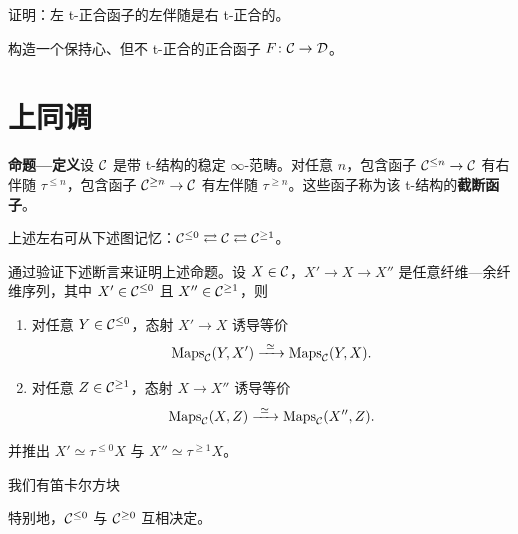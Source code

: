 \begin{exercise}\label{L16-1.12}
证明：左 t-正合函子的左伴随是右 t-正合的。
\end{exercise}

\begin{exercise}\label{L16-1.13}
构造一个保持心、但不 t-正合的正合函子 $F\colon\mathcal{C}\to\mathcal{D}$。
\end{exercise}

\section{上同调}

\nitem\label{L16-2.1}\textbf{命题—定义}\quad 设 $\mathcal{C}$ 是带 t-结构的稳定 $\infty$-范畴。对任意 $n$，包含函子 $\mathcal{C}^{\le n}\to\mathcal{C}$ 有右伴随 $\tau^{\le n}$，包含函子 $\mathcal{C}^{\ge n}\to\mathcal{C}$ 有左伴随 $\tau^{\ge n}$。这些函子称为该 t-结构的\textbf{截断函子}。

\begin{remark}\label{L16-2.2}
上述左右可从下述图记忆：$\mathcal{C}^{\le0}\rightleftarrows\mathcal{C}\rightleftarrows\mathcal{C}^{\ge1}$。
\end{remark}

\begin{exercise}\label{L16-2.3}
通过验证下述断言来证明上述命题。设 $X\in\mathcal{C}$，$X'\to X\to X''$ 是任意纤维—余纤维序列，其中 $X'\in\mathcal{C}^{\le0}$ 且 $X''\in\mathcal{C}^{\ge1}$，则
\begin{enumerate}[label=(\arabic*),leftmargin=2.4em,itemsep=0.1em]
\item 对任意 $Y\in\mathcal{C}^{\le0}$，态射 $X'\to X$ 诱导等价
\[
\operatorname{Maps}_{\cC}(Y,X')\xrightarrow{\ \simeq\ }\operatorname{Maps}_{\cC}(Y,X).
\]
\item 对任意 $Z\in\mathcal{C}^{\ge1}$，态射 $X\to X''$ 诱导等价
\[
\operatorname{Maps}_{\cC}(X,Z)\xrightarrow{\ \simeq\ }\operatorname{Maps}_{\cC}(X'',Z).
\]
\end{enumerate}
并推出 $X'\simeq\tau^{\le0}X$ 与 $X''\simeq\tau^{\ge1}X$。
\end{exercise}

\begin{exercise}\label{L16-2.4}
我们有笛卡尔方块
\begin{center}
\qquad
{}
\end{center}
特别地，$\mathcal{C}^{\le0}$ 与 $\mathcal{C}^{\ge0}$ 互相决定。
\end{exercise}

